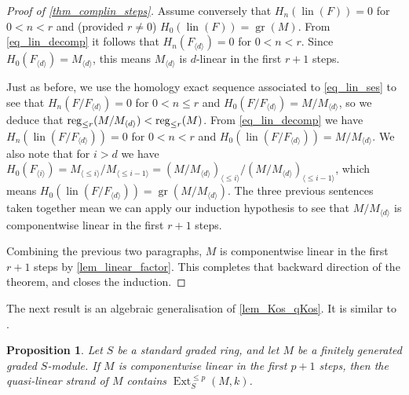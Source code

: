 \documentclass[a4paper,10pt]{amsart}
\newtheorem{proposition}[theorem]{Proposition}
\theoremstyle{definition}
\theoremstyle{remark}
\DeclareMathOperator{\gr}{gr}
\DeclareMathOperator{\lin}{lin}
\DeclareMathOperator{\Ext}{Ext}
\begin{document}
\begin{proof}[Proof of \cref{thm_complin_steps}]
Assume conversely that $H_n(\lin(F))=0$ for $0<n<r$  and (provided $r\neq 0$) $H_0(\lin(F))=\gr(M)$.  From \eqref{eq_lin_decomp} it follows that $H_n(F_{\langle d\rangle})=0$ for $0<n<r$. Since $H_0(F_{\langle d\rangle})=M_{\langle d\rangle}$, this means $M_{\langle d\rangle}$ is $d$-linear in the first $r+1$ steps.

Just as before, we use the homology exact sequence associated to \eqref{eq_lin_ses} to see
that $H_n(F/F_{\langle d\rangle})=0$ for $0<n\leq r$ and $H_0(F/F_{\langle d\rangle})=M/M_{\langle d\rangle}$, so we deduce that ${\rm reg}_{\leq r}(M/M_{\langle d\rangle})<{\rm reg}_{\leq r}(M)$. From \eqref{eq_lin_decomp} we have $H_n(\lin(F/F_{\langle d\rangle}))=0$ for $0<n<r$ and $H_0(\lin(F/F_{\langle d\rangle}))=M/M_{\langle d\rangle}$. We also note that for $i>d$ we have $H_0(F_{\langle i\rangle}) = M_{\langle  \leqslant i\rangle}/M_{\langle  \leqslant i-1\rangle}= (M/M_{\langle d\rangle})_{\langle  \leqslant i\rangle}/(M/M_{\langle d\rangle})_{\langle  \leqslant i-1\rangle}$, which means $H_0(\lin(F/F_{\langle d\rangle}))=\gr(M/M_{\langle d\rangle})$. The three previous sentences taken together mean we can apply our induction hypothesis  to see that $M/M_{\langle d\rangle}$ is componentwise linear in the first $r+1$ steps. 
 
Combining the previous two paragraphs,  $M$ is componentwise linear in the first $r+1$ steps by \cref{lem_linear_factor}. This completes that backward direction of the theorem, and closes the induction.
\end{proof}

The next result is an algebraic generalisation of \cref{lem_Kos_qKos}. It is similar to \cite[Proposition~3.4]{CS}.

\begin{proposition}\label{prop_qlinstrand}
    Let $S$ be a standard graded ring, and let $M$ be a finitely generated graded $S$-module. If $M$ is componentwise linear in the first $p+1$ steps, then the quasi-linear strand of $M$ contains $\Ext_S^{\leqslant p}(M,k)$.
\end{proposition}
\end{document}
